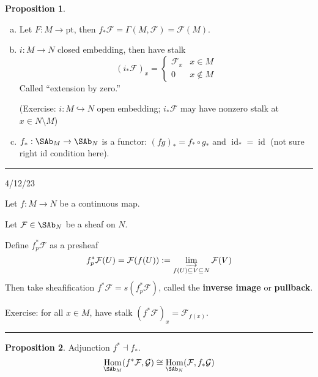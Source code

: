 \documentclass[12pt]{article}
\newcommand{\keyword}[1]{\textbf{#1}}
\newcommand{\sepline}{\rule{\textwidth}{0.4pt}}
\theoremstyle{definition}
\newtheorem{proposition}{Proposition}
\newcommand{\FF}{\mathcal{F}}
\newcommand{\GG}{\mathcal{G}}
\newcommand{\<}{\left\langle}
\renewcommand{\>}{\right\rangle}
\newcommand{\iso}{\cong}
\newcommand{\seq}{\subseteq}
\newcommand{\inc}{\hookrightarrow}
\DeclareMathOperator{\Hom}{Hom}
\DeclareMathOperator{\id}{id}
\renewcommand{\_}[1]{{_{#1}}}
\begin{document}
\begin{proposition}
    \
    \begin{enumerate}[(a)]
        \item Let $F : M \to \mathrm{pt}$, then $f_*\FF = \Gamma(M, \FF) = \FF(M)$.
        \item $i : M \to N$ closed embedding, then have stalk
        \[
            (i_*\FF)_x = \begin{cases}
                \FF_x & x \in M \\
                0 & x \notin M
            \end{cases}
        \]
        Called ``extension by zero.''

        (Exercise: $i : M \inc N$ open embedding; $i_*\FF$ may have nonzero stalk at $x \in N \setminus M$)

        \item $f_* : \SAb_M \to \SAb_N$ is a functor: $(fg)_* = f_* \circ g_*$ and $\id_* = \id$ (not sure right id condition here).
    \end{enumerate}
\end{proposition}

\sepline

4/12/23

Let $f : M \to N$ be a continuous map.

Let $\FF \in \SAb_N$ be a sheaf on $N$.

Define $f^*_p\FF$ as a presheaf
\[
    f^*_p\FF(U) = \FF(f(U)) := \varinjlim_{f(U) \seq V \seq N} \FF(V)
\]
Then take sheafification $f^*\FF = s(f^*_p\FF)$, called the \keyword{inverse image} or \keyword{pullback}.

Exercise: for all $x \in M$, have stalk $(f^*\FF)_x = \FF_{f(x)}$.

\sepline

\begin{proposition}
    Adjunction $f^* \dashv f_*$.
    \[
        \Hom_{\SAb_M}(f^*\FF, \GG) \iso \Hom_{\SAb_N}(\FF, f_*\GG)
    \]
\end{proposition}
\end{document}

